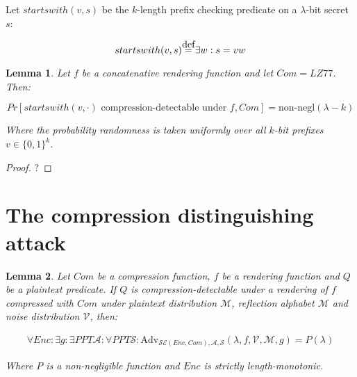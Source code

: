 \documentclass[a4paper, 11 pt, conference]{article}
\newtheorem*{lemma}{Lemma}
\newcommand\defeq{\stackrel{\mathclap{\normalfont\mbox{def}}}{=}}
\begin{document}
Let $startswith(v, s)$ be the $k$-length prefix checking predicate on a
$\lambda$-bit secret $s$:

\begin{equation*}
    startswith(v, s) \defeq \exists w: s = v w
\end{equation*}

\begin{lemma}

Let $f$ be a concatenative rendering function and let $Com = LZ77$. Then:

\begin{equation}
Pr[startswith(v, \cdot) \textrm{ compression-detectable under } f, Com] = \text{non-negl}(\lambda - k)
\end{equation}

Where the probability randomness is taken uniformly over all $k$-bit prefixes $v \in \{0, 1\}^k$.

\end{lemma}

\begin{proof}
?
\end{proof}

\section{The compression distinguishing attack}\label{sec:comattack}

\begin{lemma}

Let $Com$ be a compression function, $f$ be a rendering function and $Q$ be a
plaintext predicate. If $Q$ is compression-detectable under a rendering of $f$
compressed with $Com$ under plaintext distribution $\mathcal{M}$, reflection
alphabet $\mathcal{M}$ and noise distribution $\mathcal{V}$, then:

\begin{align*}
\forall Enc:
\exists g:
\exists PPT \mathcal{A}:
\forall PPT \mathcal{S}:
\text{Adv}_{\mathcal{SE}(Enc, Com), \mathcal{A}, \mathcal{S}}(\lambda, f, \mathcal{V}, \mathcal{M}, g) = P(\lambda)
\end{align*}

Where $P$ is a non-negligible function and $Enc$ is strictly length-monotonic.

\end{lemma}
\end{document}
